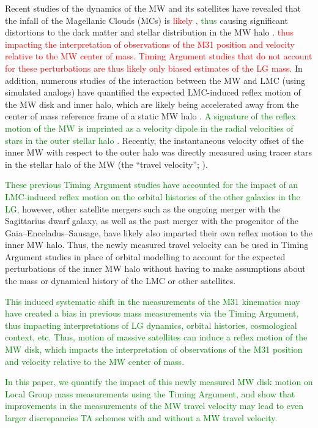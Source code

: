 \documentclass[twocolumn]{aastex631}
\newcommand{\remove}[1]{\textcolor{red}{#1}}
\newcommand{\add}[1]{\textcolor{green}{#1}}
\begin{document}
Recent studies of the dynamics of the MW and its satellites have
revealed that the infall of the Magellanic Clouds (MCs) is \remove{likely}
\add{ , thus }
causing significant distortions to the dark matter and stellar distribution in
the MW halo \citep{Laporte:2018a, Laporte:2018b, Garavito-Camargo:2019,
Conroy:2021, Erkal:2021}. 
\remove{thus impacting the interpretation of observations of the M31 position
and velocity relative to the MW center of mass. Timing Argument studies that do
not account for these perturbations are thus likely only biased estimates of the
LG mass.}
In addition, numerous studies of the interaction between the MW and LMC (using
simulated analogs) have quantified the expected LMC-induced reflex motion of the
MW disk and inner halo, which are likely being accelerated away from the center
of mass reference frame of a static MW halo \citep{Gomez2015, Cunningham:2020,
Petersen:2020, Garavito-Camargo2021b}. \add{A signature of the reflex motion of
the MW is imprinted as a velocity
dipole in the radial velocities of stars in the outer stellar halo
\cite{Garavito-Camargo2021b}.}
Recently, the instantaneous velocity offset of the inner MW with respect
to the outer halo was directly measured using tracer stars in the stellar halo
of the MW (the ``travel velocity''; \citealt{Petersen2021}).

\add{These previous Timing Argument studies have accounted for the impact of
an LMC-induced reflex motion on the orbital histories of the other galaxies in
the LG,} however, other satellite mergers such as the ongoing merger with the
Sagittarius dwarf galaxy, as well as the past merger with the progenitor of the
Gaia--Enceladus--Sausage, have likely also imparted their own reflex motion to
the inner MW halo.
Thus, the newly measured travel velocity can be used in Timing Argument studies
in place of orbital modelling to account for the expected perturbations of the
inner MW halo without having to make assumptions about the mass or dynamical
history of the LMC or other satellites.

\add{This induced systematic
shift in the measurements of the M31 kinematics may have created a bias in
previous mass measurements via the Timing Argument, thus
impacting interpretations of LG dynamics, orbital histories, cosmological
context, etc.}
\add{Thus, motion of massive satellites can induce a reflex motion of the MW
disk, which impacts the interpretation of observations of the M31
position and velocity relative to the MW center of mass.}

\add{In this paper, we quantify the impact of this newly measured MW disk motion on Local Group mass measurements using the Timing Argument, and show that improvements in the measurements of the MW travel velocity may lead to even larger discrepancies TA schemes with and without a MW travel velocity. }
\end{document}
